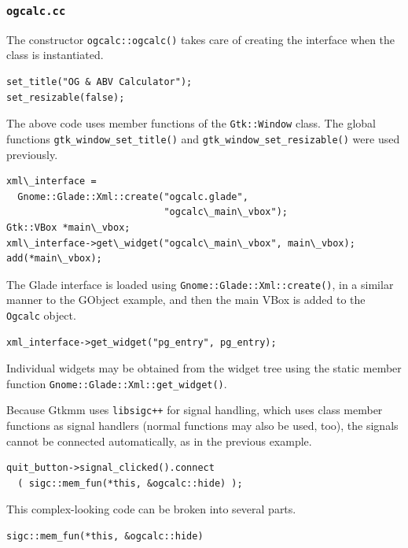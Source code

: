 \documentclass[a4paper,oneside]{article}
\newcommand{\filename}[1]{\texttt{#1}}
\newcommand{\program}[1]{\texttt{#1}}
\newcommand{\class}[1]{\texttt{#1}}
\newcommand{\function}[1]{\texttt{#1()}}
\begin{document}
\subsubsection{\filename{ogcalc.cc}}

The constructor \function{ogcalc::ogcalc} takes care of creating the
interface when the class is instantiated.

\begin{lstlisting}[numbers=none, language={[GNU]C++}]
set_title("OG & ABV Calculator");
set_resizable(false);
\end{lstlisting}

The above code uses member functions of the \class{Gtk::Window} class.
The global functions \function{gtk\_window\_set\_title} and
\function{gtk\_window\_set\_resizable} were used previously.

\begin{lstlisting}[numbers=none, language={[GNU]C++}]
xml\_interface =
  Gnome::Glade::Xml::create("ogcalc.glade",
                            "ogcalc\_main\_vbox");
Gtk::VBox *main\_vbox;
xml\_interface->get\_widget("ogcalc\_main\_vbox", main\_vbox);
add(*main\_vbox);
\end{lstlisting}

The Glade interface is loaded using
\function{Gnome::Glade::Xml::create}, in a similar manner to the
GObject example, and then the main VBox is added to the \class{Ogcalc}
object.

\begin{lstlisting}[numbers=none, language={[GNU]C++}]
xml_interface->get_widget("pg_entry", pg_entry);
\end{lstlisting}

Individual widgets may be obtained from the widget tree using the
static member function \function{Gnome::Glade::Xml::get\_widget}.

Because Gtkmm uses \program{libsigc++} for signal handling, which uses
class member functions as signal handlers (normal functions may also
be used, too), the signals cannot be connected automatically, as in
the previous example.

\begin{lstlisting}[numbers=none, language={[GNU]C++}]
quit_button->signal_clicked().connect
  ( sigc::mem_fun(*this, &ogcalc::hide) );
\end{lstlisting}

This complex-looking code can be broken into several parts.

\begin{lstlisting}[numbers=none, language={[GNU]C++}]
sigc::mem_fun(*this, &ogcalc::hide)
\end{lstlisting}
\end{document}
